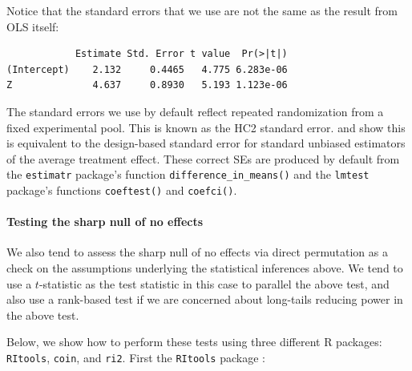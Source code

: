 \documentclass[
  12pt,
]{book}
\newenvironment{Shaded}{\begin{snugshade}}{\end{snugshade}}
\newcommand{\DataTypeTok}[1]{\textcolor[rgb]{0.13,0.29,0.53}{#1}}
\newcommand{\KeywordTok}[1]{\textcolor[rgb]{0.13,0.29,0.53}{\textbf{#1}}}
\newcommand{\NormalTok}[1]{#1}
\newcommand{\OperatorTok}[1]{\textcolor[rgb]{0.81,0.36,0.00}{\textbf{#1}}}
\newcommand{\StringTok}[1]{\textcolor[rgb]{0.31,0.60,0.02}{#1}}
\let\oldparagraph\paragraph
\renewcommand{\paragraph}[1]{\oldparagraph{#1}\mbox{}}
\theoremstyle{definition}
\theoremstyle{definition}
\theoremstyle{definition}
\theoremstyle{remark}
\begin{document}
Notice that the standard errors that we use are not the same as the
result from OLS itself:

\begin{Shaded}
\end{Shaded}

\begin{verbatim}
            Estimate Std. Error t value  Pr(>|t|)
(Intercept)    2.132     0.4465   4.775 6.283e-06
Z              4.637     0.8930   5.193 1.123e-06
\end{verbatim}

The standard errors we use by default reflect repeated randomization
from a fixed experimental pool. This is known as the HC2 standard error.
\citet{lin_agnostic_2013} and \citet{samii_equivalencies_2012} show this
is equivalent to the design-based standard error for standard unbiased
estimators of the average treatment effect. These correct SEs are
produced by default from the \texttt{estimatr} package's function
\texttt{difference\_in\_means()} and the \texttt{lmtest} package's
functions \texttt{coeftest()} and \texttt{coefci()}.

\hypertarget{testing-the-sharp-null-of-no-effects}{%
\paragraph{Testing the sharp null of no
effects}\label{testing-the-sharp-null-of-no-effects}}

We also tend to assess the sharp null of no effects via direct
permutation as a check on the assumptions underlying the statistical
inferences above. We tend to use a \(t\)-statistic as the test statistic
in this case to parallel the above test, and also use a rank-based test
if we are concerned about long-tails reducing power in the above test.

Below, we show how to perform these tests using three different R
packages: \texttt{RItools}, \texttt{coin}, and \texttt{ri2}. First the
\texttt{RItools} package \citep{R-RItools}:
\end{document}
